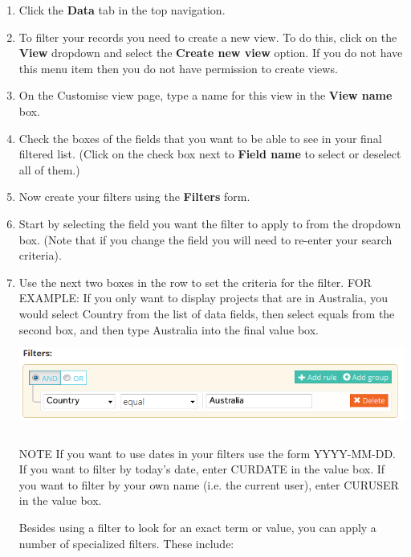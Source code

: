 \documentclass{ctrlo-int-toc}
\begin{document}
\begin{enumerate}
\item Click the \textbf{Data} tab in the top navigation.
\item To filter your records you need to create a new view. To do this, click on the \textbf{View} dropdown and select the \textbf{Create new view} option. If you do not have this menu item then you do not have permission to create views.
\item On the Customise view page, type a name for this view in the \textbf{View name} box.
\item Check the boxes of the fields that you want to be able to see in your final filtered list. (Click on the check box next to \textbf{Field name} to select or deselect all of them.)
\item Now create your filters using the \textbf{Filters} form.
\item Start by selecting the field you want the filter to apply to from the dropdown box. (Note that if you change the field you will need to re-enter your search criteria).
\item Use the next two boxes in the row to set the criteria for the filter. FOR EXAMPLE: If you only want to display projects that are in Australia, you would select Country from the list of data fields, then select equals from the second box, and then type Australia into the final value box. \newline
\includegraphics[width=15.921cm,height=3.069cm]{userguide-img/userguide-img002.png}
 

\begin{notebox}
NOTE
If you want to use dates in your filters use the form YYYY-MM-DD.\newline
If you want to filter by today's date, enter CURDATE in the value box. If you want to filter by your own name (i.e. the current user), enter CURUSER in the value box. 
\end{notebox}

Besides using a filter to look for an exact term or value, you can apply a number of specialized filters. These include:


\end{enumerate}
\end{document}
